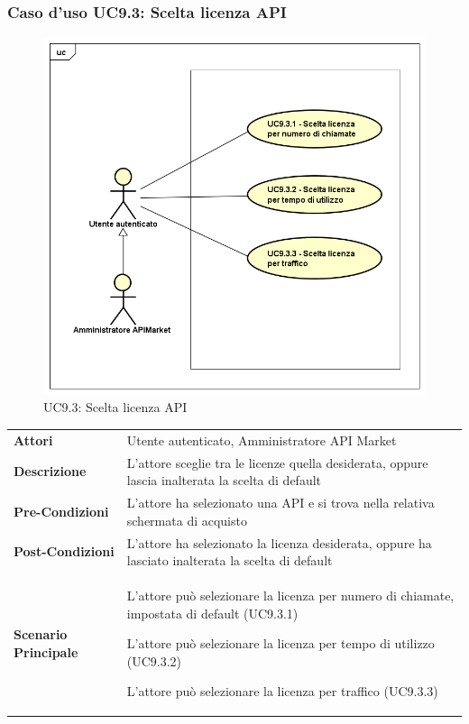 \newpage
\subsubsection{Caso d'uso UC9.3: Scelta licenza API}
\label{UC9_3}
\begin{figure}[ht]
	\centering
	\includegraphics[scale=0.45]{UML/UC9_3.png}
	\caption{UC9.3: Scelta licenza API}
\end{figure}

\begin{minipage}{\linewidth}
	\begin{tabular}{ l | p{11cm}}
		\hline
		\rowcolor{Gray}
		\multicolumn{2}{c}{UC9.1 - Visualizzazione menù licenza} \\
		\hline
		\textbf{Attori} & Utente autenticato, Amministratore API Market \\
		\textbf{Descrizione} & L'attore sceglie tra le licenze quella desiderata, oppure lascia inalterata la scelta di default \\
		\textbf{Pre-Condizioni} & L'attore ha selezionato una API e si trova nella relativa schermata di acquisto \\
		\textbf{Post-Condizioni} & L'attore ha selezionato la licenza desiderata, oppure ha lasciato inalterata la scelta di default \\
		\textbf{Scenario Principale} & 
		\begin{enumerate*}[label=(\arabic*.),itemjoin={\newline}]
			\item L'attore può selezionare la licenza per numero di chiamate, impostata di default (UC9.3.1)
			\item L'attore può selezionare la licenza per tempo di utilizzo (UC9.3.2)
			\item L'attore può selezionare la licenza per traffico (UC9.3.3)
		\end{enumerate*}\\
	\end{tabular}
\end{minipage}

